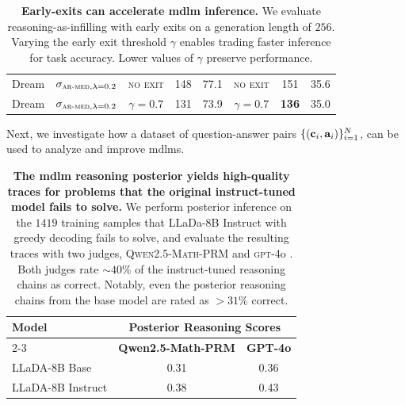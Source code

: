 \begin{table}[h]
\begin{tabular}{ll ccc ccc}
        \midrule
        Dream & $\sigma_{\textsc{ar-med}, \lambda = 0.2}$ & \textsc{no exit} & 148 & 77.1 & \textsc{no exit} & 151 & 35.6 \\
        Dream & $\sigma_{\textsc{ar-med}, \lambda = 0.2}$ & $\gamma=0.7$     & 131 & 73.9 & $\gamma=0.7$     & \textbf{136} & 35.0 \\
    \bottomrule
    \end{tabular}
    \caption{\textbf{Early-exits can accelerate \gls{mdlm} inference.} We evaluate reasoning-as-infilling with early exits on a generation length of $256$. Varying the early exit threshold $\gamma$ enables trading faster inference for task accuracy. Lower values of $\gamma$ preserve performance.}
    \label{tab:early_exit_combined}
\end{table}

Next, we investigate how a dataset of question-answer pairs $\{(\mathbf{c}_i, \mathbf{a}_i)\}_{i=1}^{N}$, can be used to analyze and improve \glspl{mdlm}. 

\begin{table}[h]
\centering
\begin{tabular}{lcc}
\toprule
\textbf{Model} & \multicolumn{2}{c}{\textbf{Posterior Reasoning Scores}} \\
\cmidrule(lr){2-3}
 & \textbf{Qwen2.5-Math-PRM} & \textbf{GPT-4o} \\
\midrule
LLaDA-8B Base  & 0.31 & 0.36 \\
LLaDA-8B Instruct & 0.38 & 0.43 \\
\bottomrule
\end{tabular}
\label{tab:judge_scores}
\caption{\textbf{The \gls{mdlm} reasoning posterior yields high-quality traces for problems that the original instruct-tuned model fails to solve.} We perform posterior inference on the $1419$ training samples that LLaDa-8B Instruct with greedy decoding fails to solve, and evaluate the resulting traces with two judges, \textsc{Qwen2.5-Math-PRM} \citep{zhang2025lessons} and \textsc{gpt-4}o \citep{hurst2024gpt}. Both judges rate $\sim40\%$ of the instruct-tuned reasoning chains as correct. Notably, even the posterior reasoning chains from the base model are rated as $>31\%$ correct.}
\end{table}

